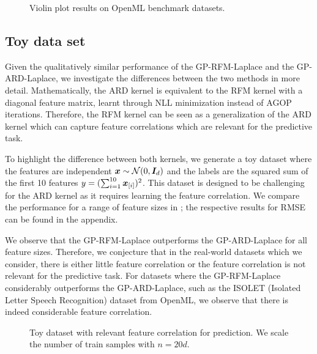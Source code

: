 \begin{figure}[htb]
\begin{subfigure}[b]{0.475\textwidth}
    \end{subfigure}
    \caption{Violin plot results on OpenML benchmark datasets.}
    \label{fig:main-tabular-benchmark}
\end{figure}









\subsection{Toy data set}
Given the qualitatively similar performance of the GP-RFM-Laplace and the GP-ARD-Laplace, we investigate the differences between the two methods in more detail.
Mathematically, the ARD kernel is equivalent to the RFM kernel with a diagonal feature matrix, learnt through NLL minimization instead of AGOP iterations.
Therefore, the RFM kernel can be seen as a generalization of the ARD kernel which can capture feature correlations which are relevant for the predictive task.

To highlight the difference between both kernels, we generate a toy dataset
where the features are independent ${\bm{x}}\sim{\mathcal{N}}(0,{\bm{I}}_d)$ and the labels are the squared sum of the first 10 features $y=(\sum_{i=1}^{10} {\bm{x}}_{[i]})^2$.
This dataset is designed to be challenging for the ARD kernel as it requires learning the feature correlation.
We compare the performance for a range of feature sizes in ; the respective results for RMSE can be found in the appendix.

We observe that the GP-RFM-Laplace outperforms the GP-ARD-Laplace for all feature sizes.
Therefore, we conjecture that in the real-world datasets which we consider, there is either little feature correlation or the feature correlation is not relevant for the predictive task.
For datasets where the GP-RFM-Laplace considerably outperforms the GP-ARD-Laplace, such as the ISOLET (Isolated Letter Speech Recognition) dataset from OpenML, we observe that there is indeed considerable feature correlation.

\begin{figure}
    \centering
    
    \caption{Toy dataset with relevant feature correlation for prediction. We scale the number of train samples with $n=20 d$.}
    \label{fig:toy-data-nll}
\end{figure}








